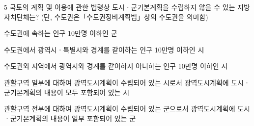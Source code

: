 \begin{question}{5}
국토의 계획 및 이용에 관한 법령상 도시ㆍ군기본계획을 수립하지 않을 수 있는 지방자치단체는? (단, 수도권은「수도권정비계획법」상의 수도권을 의미함)
\begin{choices}
  \item 수도권에 속하는 인구 10만명 이하인 군
  \item 수도권에서 광역시ㆍ특별시와 경계를 같이하는 인구 10만명 이하인 시
  \item 수도권외 지역에서 광역시와 경계를 같이하지 아니하는 인구 10만명 이하인 시
  \item 관할구역 일부에 대하여 광역도시계획이 수립되어 있는 시로서 광역도시계획에 도시ㆍ군기본계획의 내용이 모두 포함되어 있는 시
  \item 관할구역 전부에 대하여 광역도시계획이 수립되어 있는 군으로서 광역도시계획에 도시ㆍ군기본계획의 내용이 일부 포함되어 있는 군
\end{choices}
\end{question}
